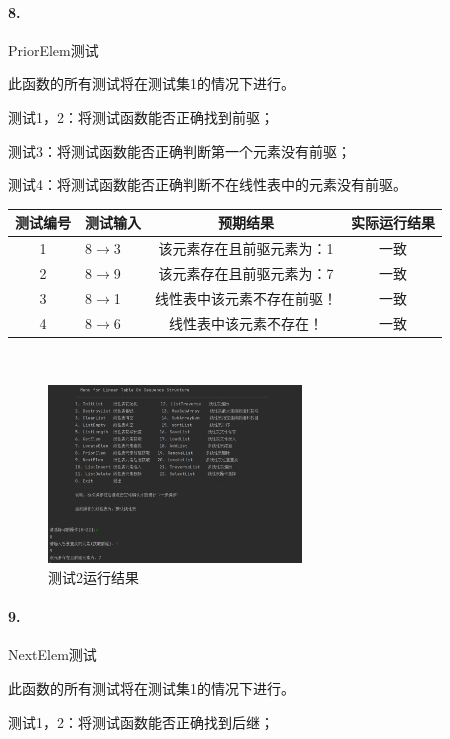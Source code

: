 \documentclass[supercite]{Experimental_Report}
\theoremstyle{definition}
\begin{document}
\paragraph{ 8.}PriorElem测试

    此函数的所有测试将在测试集1的情况下进行。

    测试1，2：将测试函数能否正确找到前驱；

    测试3：将测试函数能否正确判断第一个元素没有前驱；

    测试4：将测试函数能否正确判断不在线性表中的元素没有前驱。

\vspace{0.5em}

\begin{tabular}{|c|l|c|c|}
	\hline
	测试编号 & 测试输入 & 预期结果 & 实际运行结果 \\
	\hline
	1 & 8$\rightarrow$3 & 该元素存在且前驱元素为：1 & 一致 \\
	\hline
	2 & 8$\rightarrow$9 & 该元素存在且前驱元素为：7 & 一致 \\
	\hline
	3 & 8$\rightarrow$1 & 线性表中该元素不存在前驱！ & 一致 \\
	\hline
	4 & 8$\rightarrow$6 & 线性表中该元素不存在！ & 一致 \\
	\hline
\end{tabular}

~\

 \begin{figure}[H]
 	\centering
 	\includegraphics[width=0.6\textwidth]{images/线性表测试8.png}
 	\caption{测试2运行结果}
 	\label{txlab}
 \end{figure}


\paragraph{ 9.}NextElem测试

    此函数的所有测试将在测试集1的情况下进行。

    测试1，2：将测试函数能否正确找到后继；
\end{document}
